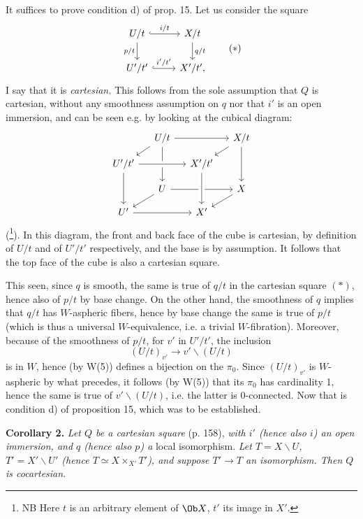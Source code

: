 It suffices to prove condition d) of prop. 15. Let us consider the square
\[
\begin{tikzcd}
U/t \ar[r, hook, "i/t"] \ar[d, "p/t"'] & X/t \ar[d, "q/t"] \\
U'/t' \ar[r, hook, "i'/t'"] & X'/t',
\end{tikzcd}
\tag*{$(*)$}
\]
I say that it is \textit{cartesian.} This follows from the sole assumption that $Q$ is cartesian, without any smoothness assumption on $q$ nor that $i'$ is an open immersion, and can be seen e.g. by looking at the cubical diagram:
\[
\begin{tikzcd}[row sep=small, column sep=small]
& U/t \ar[rr] \ar[dl] \ar[dd] & & X/t \ar[dl] \ar[dd] \\
U'/t' \ar[rr, crossing over] \ar[dd] & & X'/t' & \\
& U \ar[rr] \ar[dl] & & X \ar[dl] \\
U' \ar[rr] & & X' \ar[from=uu, crossing over] &
\end{tikzcd}
\]
(\footnote[110]{NB Here $t$ is an arbitrary element of $\Ob X$, $t'$ its image in $X'$.}). In this diagram, the front and back face of the cube is cartesian, by definition of $U/t$ and of $U'/t'$
respectively, and the base is by assumption. It follows that the top face of the cube is also a cartesian square.

This seen, since $q$ is smooth, the same is true of $q/t$ in the cartesian square $(*)$, hence also of $p/t$ by base change. On the other hand, the smoothness of $q$ implies that $q/t$ has $W$-aspheric fibers, hence by base change the same is true of $p/t$ (which is thus a universal $W$-equivalence, i.e. a trivial $W$-fibration). Moreover, because of the smoothness of $p/t$, for $v'$ in $U'/t'$, the inclusion %
\[
(U/t)_{v'} \longrightarrow v' \backslash (U/t)
\]
is in $W$, hence (by W(5)) defines a bijection on the $\pi_0$. Since $(U/t)_{v'}$ is $W$-aspheric by what precedes, it follows (by W(5)) that its $\pi_0$ has cardinality 1, hence the same is true of $v' \backslash (U/t)$, i.e. the latter is 0-connected. Now that is condition d) of proposition 15, which was to be established.

\textbf{Corollary 2.} \textit{Let $Q$ be a cartesian square} (p. 158), \textit{with $i'$ (hence also $i$) an open immersion, and $q$ (hence also $p$) a} local isomorphism. \textit{Let $T = X \backslash U$, $T' = X' \backslash U'$ (hence $T \simeq X \times_{X'} T'$), and suppose $T' \longrightarrow T$ an isomorphism. Then $Q$ is cocartesian.}


